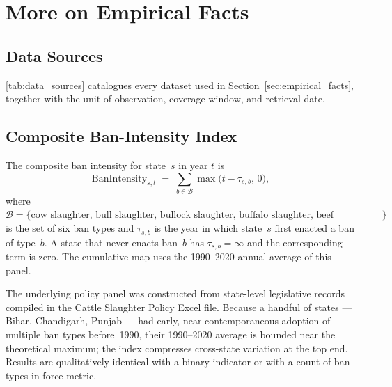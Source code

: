 
\appendix
\renewcommand{\thesection}{\Alph{section}}
\renewcommand{\thesubsection}{\Alph{section}.\arabic{subsection}}
\renewcommand{\thetable}{A.\arabic{table}}
\renewcommand{\thefigure}{A.\arabic{figure}}
\setcounter{table}{0}
\setcounter{figure}{0}

\section{More on Empirical Facts} \label{app:more_empirical_facts}

\subsection{Data Sources} \label{app:data_sources}

\autoref{tab:data_sources} catalogues every dataset used in
Section~\ref{sec:empirical_facts}, together with the unit of observation,
coverage window, and retrieval date.

\subsection{Composite Ban-Intensity Index} \label{app:ban_intensity}

The composite ban intensity for state~$s$ in year $t$ is
\begin{equation*}
\text{BanIntensity}_{s,t}
\;=\;\sum_{b\in\mathcal{B}} \max\!\big(t-\tau_{s,b},\,0\big),
\end{equation*}
where $\mathcal{B}=\{\text{cow slaughter, bull slaughter, bullock slaughter,
buffalo slaughter, beef possession, beef sales}\}$ is the set of six ban
types and $\tau_{s,b}$ is the year in which state~$s$ first enacted a ban of
type~$b$. A state that never enacts ban~$b$ has $\tau_{s,b}=\infty$ and the
corresponding term is zero. The cumulative map uses the
1990--2020 annual average of this panel.

The underlying policy panel was constructed from state-level legislative
records compiled in the Cattle Slaughter Policy Excel file. Because a handful of states --- Bihar, Chandigarh,
Punjab --- had early, near-contemporaneous adoption of multiple ban types
before~1990, their 1990--2020 average is bounded near the theoretical
maximum; the index compresses cross-state variation at the top end. Results
are qualitatively identical with a binary indicator or with a
count-of-ban-types-in-force metric.

